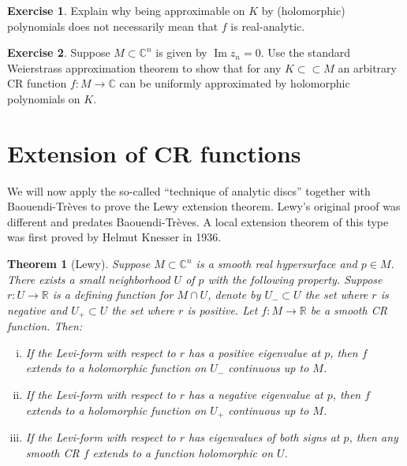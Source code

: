 \documentclass[12pt,openany]{book}
\renewcommand{\Im}{\operatorname{Im}}
\newcommand{\C}{{\mathbb{C}}}
\newcommand{\R}{{\mathbb{R}}}
\theoremstyle{plain}
\newtheorem{thm}{Theorem}[section]
\theoremstyle{remark}
\theoremstyle{definition}
\newenvironment{exbox}{%
    \def\FrameCommand{\vrule width 1pt \relax\hspace {10pt}}%
    \MakeFramed {\advance \hsize -\width \FrameRestore }%
}{%
    \endMakeFramed
}
\theoremstyle{exercise}
\newtheorem{exercise}{Exercise}[section]
\theoremstyle{example}
\begin{document}
\begin{exbox}
\begin{exercise}
Explain why being approximable on $K$ by (holomorphic) polynomials does not
necessarily mean that
$f$ is real-analytic.
\end{exercise}

\begin{exercise}
Suppose $M \subset \C^n$ is given by $\Im z_n = 0$.  Use the standard
Weierstrass approximation theorem to show that for any $K \subset \subset M$
an arbitrary CR function $f \colon M \to \C$ can be uniformly approximated
by holomorphic polynomials on $K$.
\end{exercise}
\end{exbox}


\section{Extension of CR functions}

We will now apply the so-called ``technique of analytic discs'' together
with
Baouendi-Tr{\`e}ves to prove the
Lewy extension theorem.  Lewy's original proof was different
and predates Baouendi-Tr{\`e}ves.  A local extension theorem of this type
was first proved by Helmut Knesser in 1936.

\begin{thm}[Lewy]%
Suppose $M \subset \C^n$ is a smooth real hypersurface and $p \in M$.
There exists a small neighborhood $U$ of $p$ with the following
property.
Suppose $r \colon U \to \R$ is
a defining function for $M \cap U$, denote by $U_- \subset U$ the set where $r$
is negative and $U_+ \subset U$ the set where $r$ is positive.
Let $f \colon M \to \R$ be a smooth CR function.
Then:

\begin{enumerate}[(i)]
\item
If the Levi-form with respect to $r$ has a positive eigenvalue at $p$, then
$f$ extends to a holomorphic function on $U_-$ continuous up to $M$.
\item
If the Levi-form with respect to $r$ has a negative eigenvalue at $p$, then
$f$ extends to a holomorphic function on $U_+$ continuous up to $M$.
\item
If the Levi-form with respect to $r$ has eigenvalues of both signs at $p$, then any smooth
CR $f$ extends to
a function holomorphic on $U$.
\end{enumerate}
\end{thm}
\end{document}
